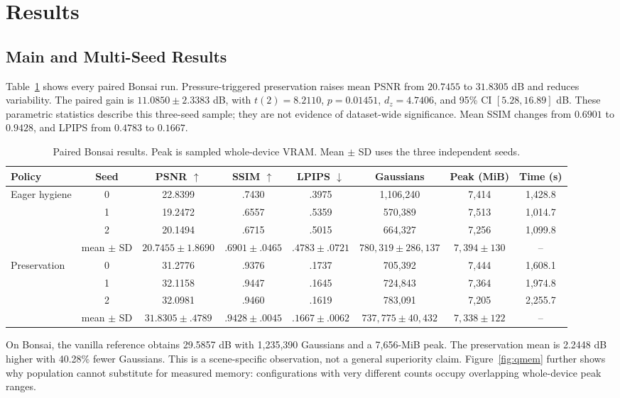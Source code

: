 \section{Results}
\subsection{Main and Multi-Seed Results}
Table~\ref{tab:seeds} shows every paired Bonsai run. Pressure-triggered preservation raises mean PSNR from $20.7455$ to $31.8305$ dB and reduces variability. The paired gain is $11.0850\pm2.3383$ dB, with $t(2)=8.2110$, $p=0.01451$, $d_z=4.7406$, and 95\% CI $[5.28,16.89]$ dB. These parametric statistics describe this three-seed sample; they are not evidence of dataset-wide significance. Mean SSIM changes from $0.6901$ to $0.9428$, and LPIPS from $0.4783$ to $0.1667$.

\begin{table}[t]
\centering\scriptsize
\caption{Paired Bonsai results. Peak is sampled whole-device VRAM. Mean $\pm$ SD uses the three independent seeds.}
\label{tab:seeds}
\begin{tabular}{lccccccc}
\toprule
Policy & Seed & PSNR $\uparrow$ & SSIM $\uparrow$ & LPIPS $\downarrow$ & Gaussians & Peak (MiB) & Time (s)\\
\midrule
Eager hygiene & 0 & 22.8399 & .7430 & .3975 & 1,106,240 & 7,414 & 1,428.8\\
& 1 & 19.2472 & .6557 & .5359 & 570,389 & 7,513 & 1,014.7\\
& 2 & 20.1494 & .6715 & .5015 & 664,327 & 7,256 & 1,099.8\\
& mean $\pm$ SD & $20.7455\pm1.8690$ & $.6901\pm.0465$ & $.4783\pm.0721$ & $780,319\pm286,137$ & $7,394\pm130$ & --\\
\midrule
Preservation & 0 & 31.2776 & .9376 & .1737 & 705,392 & 7,444 & 1,608.1\\
& 1 & 32.1158 & .9447 & .1645 & 724,843 & 7,364 & 1,974.8\\
& 2 & 32.0981 & .9460 & .1619 & 783,091 & 7,205 & 2,255.7\\
& mean $\pm$ SD & $\mathbf{31.8305\pm.4789}$ & $\mathbf{.9428\pm.0045}$ & $\mathbf{.1667\pm.0062}$ & $737,775\pm40,432$ & $7,338\pm122$ & --\\
\bottomrule
\end{tabular}
\end{table}

On Bonsai, the vanilla reference obtains 29.5857 dB with 1,235,390 Gaussians and a 7,656-MiB peak. The preservation mean is 2.2448 dB higher with 40.28\% fewer Gaussians. This is a scene-specific observation, not a general superiority claim. Figure~\ref{fig:qmem} further shows why population cannot substitute for measured memory: configurations with very different counts occupy overlapping whole-device peak ranges.

